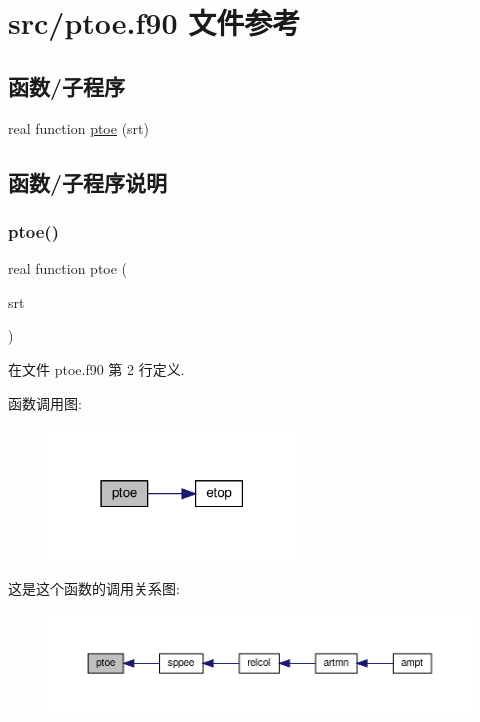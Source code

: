 \hypertarget{ptoe_8f90}{}\section{src/ptoe.f90 文件参考}
\label{ptoe_8f90}
\subsection*{函数/子程序}
\begin{DoxyCompactItemize}
\item 
real function \mbox{\hyperlink{ptoe_8f90_aa037cf75a719054ec812d0db46a145be}{ptoe}} (srt)
\end{DoxyCompactItemize}


\subsection{函数/子程序说明}
\mbox{\label{ptoe_8f90_aa037cf75a719054ec812d0db46a145be}} 
\subsubsection{\texorpdfstring{ptoe()}{ptoe()}}
{\footnotesize\ttfamily real function ptoe (\begin{DoxyParamCaption}\item[{}]{srt }\end{DoxyParamCaption})}



在文件 ptoe.\+f90 第 2 行定义.

函数调用图\+:
\nopagebreak
\begin{figure}[H]
\begin{center}
\leavevmode
\includegraphics[width=186pt]{ptoe_8f90_aa037cf75a719054ec812d0db46a145be_cgraph}
\end{center}
\end{figure}
这是这个函数的调用关系图\+:
\nopagebreak
\begin{figure}[H]
\begin{center}
\leavevmode
\includegraphics[width=350pt]{ptoe_8f90_aa037cf75a719054ec812d0db46a145be_icgraph}
\end{center}
\end{figure}
